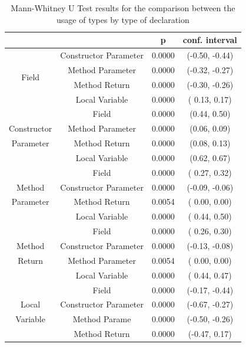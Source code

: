 \documentclass[preprint]{sigplanconf}
\renewcommand{\arraystretch}{1.2}
\begin{document}

\begin{table}[ht]

\centering{}%
\renewcommand{\arraystretch}{1.2}

\begin{tabular}{|c|c|c|c|}
\hline 
								& {}					& p  	      & conf. interval\\
\hline
\hline
\multirow{4}{*}{Field}			& Constructor Parameter	& 0.0000 & (-0.50, -0.44)\\
								& Method Parameter		& 0.0000 & (-0.32, -0.27)\\
								& Method Return			& 0.0000 & (-0.30, -0.26)\\
								& Local Variable 		& 0.0000 & ( 0.13, 0.17)\\
\hline
{}								& Field					& 0.0000 & (0.44, 0.50)	\\
Constructor						& Method Parameter		& 0.0000 & (0.06, 0.09)	\\
Parameter						& Method Return			& 0.0000 & (0.08, 0.13)	\\
{}								& Local Variable		& 0.0000 & (0.62, 0.67)	\\
\hline
{}								& Field					& 0.0000 & ( 0.27,  0.32)	\\
Method							& Constructor Parameter	& 0.0000 & (-0.09, -0.06)	\\
Parameter						& Method Return			& 0.0054 & ( 0.00,  0.00)	\\
{}								& Local Variable		& 0.0000 & ( 0.44,  0.50)	\\
\hline
{}								& Field					& 0.0000 & ( 0.26,  0.30)	\\
Method							& Constructor Parameter	& 0.0000 & (-0.13, -0.08)	\\
Return							& Method Parameter		& 0.0054 & ( 0.00,  0.00)	\\
{}								& Local Variable		& 0.0000 & ( 0.44,  0.47)	\\
\hline
{}								& Field					& 0.0000 & (-0.17, -0.44) \\
Local							& Constructor Parameter	& 0.0000 & (-0.67, -0.27) \\
Variable						& Method Parame			& 0.0000 & (-0.50, -0.26) \\
{}								& Method Return			& 0.0000 & (-0.47,  0.17) \\
\hline  
\end{tabular}
\caption{Mann-Whitney U Test results for the comparison between the usage of types by type of declaration}
\label{tab:all_utest_type}
\end{table}
\end{document}
